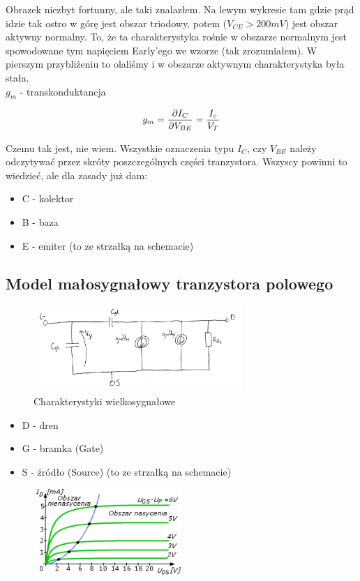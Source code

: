\documentclass[10pt,a4paper]{article}
\begin{document}
Obrazek niezbyt fortunny, ale taki znalazłem. Na lewym wykresie tam gdzie prąd idzie tak ostro w górę jest obszar triodowy, potem ($V_{CE} > 200mV$) jest obszar aktywny normalny. To, że ta charakterystyka rośnie w obszarze normalnym jest spowodowane tym napięciem Early'ego we wzorze (tak zrozumiałem). W pierszym przybliżeniu to olaliśmy i w obszarze aktywnym charakterystyka była stała.\\


$g_m$ - transkonduktancja

\begin{equation}
g_m = {\partial I_C \over \partial V_{BE}} = {I_c \over V_T}
\end{equation}

Czemu tak jest, nie wiem. Wszystkie oznaczenia typu $I_C$, czy $V_{BE}$ należy odczytywać przez skróty poszczególnych części tranzystora. Wszyscy powinni to wiedzieć, ale dla zasady już dam:
\begin{itemize}
\item C - kolektor
\item B - baza
\item E - emiter (to ze strzałką na schemacie)
\end{itemize}



\subsection{Model małosygnałowy tranzystora polowego}
\begin{figure}[H]
\centering
\includegraphics[width=0.7\textwidth]{malosyg_mos}
\caption{Charakterystyki wielkosygnałowe}
\end{figure}

\begin{itemize}
\item D - dren
\item G - bramka (Gate)
\item S - źródło (Source) (to ze strzałką na schemacie)
\end{itemize}

\begin{figure}[H]
\centering
\includegraphics[width=0.5\textwidth]{charPol}
\end{figure}
\end{document}
